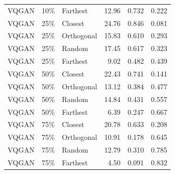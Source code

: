 \begin{longtable}{lllrrr}
VQGAN & 10\% & Farthest & 12.96 & 0.732 & 0.222 \\
VQGAN & 25\% & Closest & 24.76 & 0.846 & 0.081 \\
VQGAN & 25\% & Orthogonal & 15.83 & 0.610 & 0.293 \\
VQGAN & 25\% & Random & 17.45 & 0.617 & 0.323 \\
VQGAN & 25\% & Farthest & 9.02 & 0.482 & 0.439 \\
VQGAN & 50\% & Closest & 22.43 & 0.741 & 0.141 \\
VQGAN & 50\% & Orthogonal & 13.12 & 0.384 & 0.477 \\
VQGAN & 50\% & Random & 14.84 & 0.431 & 0.557 \\
VQGAN & 50\% & Farthest & 6.39 & 0.247 & 0.667 \\
VQGAN & 75\% & Closest & 20.78 & 0.633 & 0.208 \\
VQGAN & 75\% & Orthogonal & 10.91 & 0.178 & 0.645 \\
VQGAN & 75\% & Random & 12.79 & 0.310 & 0.785 \\
VQGAN & 75\% & Farthest & 4.50 & 0.091 & 0.832 \\
\end{longtable}
\endgroup

